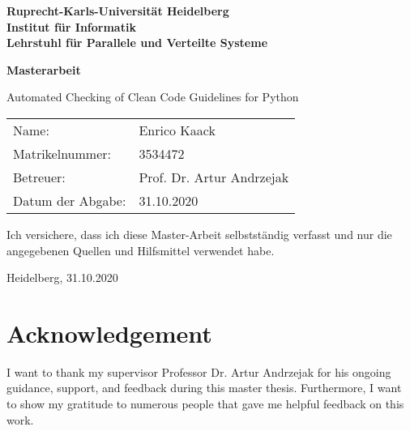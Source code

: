 \documentclass[
     12pt,                    %
     a4paper,             %
     BCOR10mm,     %
     DIV14,                 %
     listof=totoc,                    %
     bibliography=totoc,       %
     index=totoc,              %
     twoside,
     headsepline
     ]{scrreprt}
\begin{document}
\begin{titlepage}


\vspace*{1cm}
\begin{center}
\vspace*{3cm}
\textbf{ 
\Large Ruprecht-Karls-Universität Heidelberg\\
\smallskip
\Large Institut für Informatik\\
\smallskip
\Large Lehrstuhl für Parallele und Verteilte Systeme\\
\smallskip
}

\vspace{3cm}

\textbf{\large Masterarbeit} 

\vspace{0.5\baselineskip}
{\huge
Automated Checking of Clean Code Guidelines for Python
}
\end{center}

\vfill 

{\large
\begin{tabular}[l]{ll}
Name: & Enrico Kaack\\
Matrikelnummer: & 3534472\\
Betreuer: & Prof. Dr. Artur Andrzejak\\
Datum der Abgabe: & 31.10.2020
\end{tabular}
}

\end{titlepage}

\onehalfspacing

\thispagestyle{empty}

\vspace*{100pt}
\noindent
Ich versichere, dass ich diese Master-Arbeit selbstständig verfasst und nur die angegebenen
Quellen und Hilfsmittel verwendet habe.

\vspace*{50pt}

\noindent
Heidelberg, 31.10.2020
\cleardoublepage






\newpage
\section*{Acknowledgement}
I want to thank my supervisor Professor Dr. Artur Andrzejak for his ongoing guidance, support, and feedback during this master thesis.
Furthermore, I want to show my gratitude to numerous people that gave me helpful feedback on this work.
\end{document}
